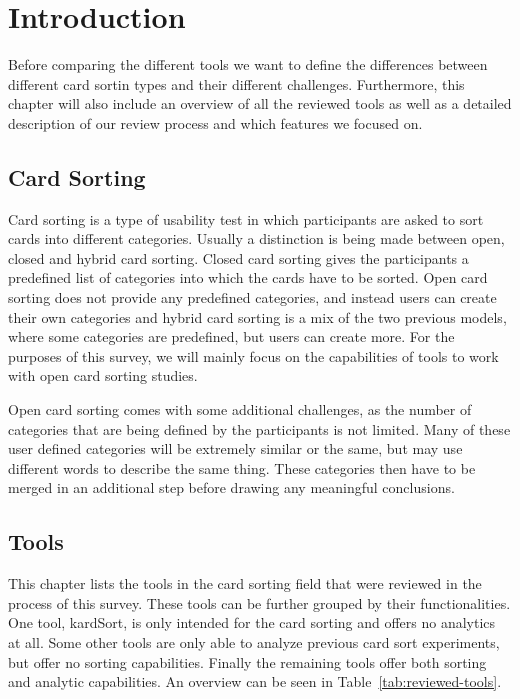 \chapter{Introduction}

\label{chap:Intro}

Before comparing the different tools we want to define the differences between 
different card sortin types and their different challenges. Furthermore, this 
chapter will also include an overview of all the reviewed tools as well as a 
detailed description of our review process and which features we focused on.


\section{Card Sorting}
Card sorting is a type of usability test in which participants are asked to sort
cards into different categories. Usually a distinction is being made between 
open, closed and hybrid card sorting. Closed card sorting gives the participants
a predefined list of categories into which the cards have to be sorted. Open 
card sorting does not provide any predefined categories, and instead users can
 create their own categories and hybrid card sorting is a mix of the two 
 previous models, where some categories are predefined, but users can create 
 more. For the purposes of this survey, we will mainly focus on the capabilities
 of tools to work with open card sorting studies.

Open card sorting comes with some additional challenges, as the number of 
categories that are being defined by the participants is not limited. Many of 
these user defined categories will be extremely similar or the same, but may 
use different words to describe the same thing. These categories then have to 
be merged in an additional step before drawing any meaningful conclusions.

\section{Tools} This chapter lists the tools in the card sorting field
that were reviewed in the process of this survey. These tools can be
further grouped by their functionalities. One tool, kardSort, is only
intended for the card sorting and offers no analytics at all. Some
other tools are only able to analyze previous card sort experiments,
but offer no sorting capabilities. Finally the remaining tools offer
both sorting and analytic capabilities. An overview can be seen in
Table~\ref{tab:reviewed-tools}.

